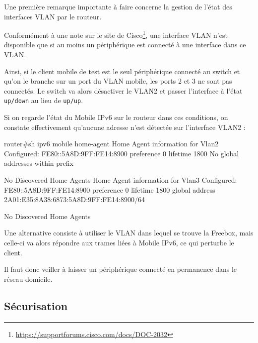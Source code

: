 \begin{warning}
Une première remarque importante à faire concerne la gestion de l'état des interfaces VLAN par le routeur.

Conformément à une note sur le site de Cisco\footnote{\url{https://supportforums.cisco.com/docs/DOC-2032}}, une interface VLAN n'est disponible que si au moins un périphérique est connecté à une interface dans ce VLAN.

Ainsi, si le client mobile de test est le seul périphérique connecté au switch et qu'on le branche sur un port du VLAN mobile, les ports 2 et 3 ne sont pas connectés.
Le switch va alors désactiver le VLAN2 et passer l'interface à l'état \texttt{up/down} au lieu de \texttt{up/up}.

Si on regarde l'état du Mobile IPv6 sur le routeur dans ces conditions, on constate effectivement qu'aucune adresse n'est détectée sur l'interface VLAN2 :
\begin{code}
router#sh ipv6 mobile home-agent
Home Agent information for Vlan2
  Configured:
    FE80::5A8D:9FF:FE14:8900
    preference 0 lifetime 1800
      No global addresses within prefix

  No Discovered Home Agents
Home Agent information for Vlan3
  Configured:
    FE80::5A8D:9FF:FE14:8900
    preference 0 lifetime 1800
      global address 2A01:E35:8A38:6873:5A8D:9FF:FE14:8900/64

  No Discovered Home Agents
\end{code}

Une alternative consiste à utiliser le VLAN dans lequel se trouve la Freebox, mais celle-ci va alors répondre aux trames liées à Mobile IPv6, ce qui perturbe le client.

Il faut donc veiller à laisser un périphérique connecté en permanence dans le réseau domicile.
\end{warning}


\subsection{Sécurisation}
